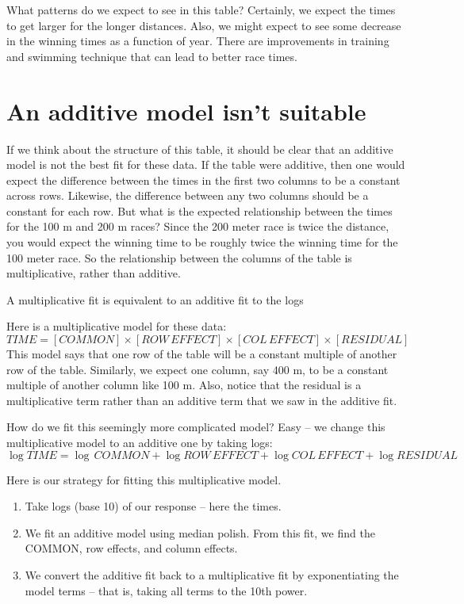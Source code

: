 \documentclass[
]{book}
\providecommand{\tightlist}{%
  \setlength{\itemsep}{0pt}\setlength{\parskip}{0pt}}
\begin{document}
What patterns do we expect to see in this table? Certainly, we expect the times to get larger for the longer distances. Also, we might expect to see some decrease in the winning times as a function of year. There are improvements in training and swimming technique that can lead to better race times.

\hypertarget{an-additive-model-isnt-suitable}{%
\section{An additive model isn't suitable}\label{an-additive-model-isnt-suitable}}

If we think about the structure of this table, it should be clear that an additive model is not the best fit for these data. If the table were additive, then one would expect the difference between the times in the first two columns to be a constant across rows. Likewise, the difference between any two columns should be a constant for each row. But what is the expected relationship between the times for the 100 m and 200 m races? Since the 200 meter race is twice the distance, you would expect the winning time to be roughly twice the winning time for the 100 meter race. So the relationship between the columns of the table is multiplicative, rather than additive.

A multiplicative fit is equivalent to an additive fit to the logs

Here is a multiplicative model for these data:
\[
TIME = [COMMON] \times [ROW \, EFFECT] \times [ COL \,EFFECT] \times [RESIDUAL]
\]
This model says that one row of the table will be a constant multiple of another row of the table. Similarly, we expect one column, say 400 m, to be a constant multiple of another column like 100 m. Also, notice that the residual is a multiplicative term rather than an additive term that we saw in the additive fit.

How do we fit this seemingly more complicated model? Easy -- we change this multiplicative model to an additive one by taking logs:
\[
\log TIME = \log \, COMMON + \log ROW \, EFFECT + \log COL \, EFFECT + 
\log RESIDUAL
\]

Here is our strategy for fitting this multiplicative model.

\begin{enumerate}
\def\labelenumi{\arabic{enumi}.}
\tightlist
\item
  Take logs (base 10) of our response -- here the times.
\item
  We fit an additive model using median polish. From this fit, we find the COMMON, row effects, and column effects.
\item
  We convert the additive fit back to a multiplicative fit by exponentiating the model terms -- that is, taking all terms to the 10th power.
\end{enumerate}
\end{document}
